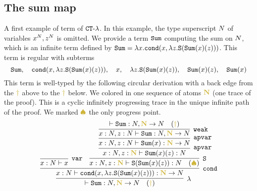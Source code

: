 \documentclass{article}
\begin{document}
\subsection{The sum map}
A first example of term of  ${ {\tt CT} \mbox{-} \lambda}$. 
In this example, the type superscript ${N}$ of variables $x^{N}, z^{N}$ is omitted.
We provide a term ${\tt Sum}$ computing the sum on ${N}$,
which is an infinite term defined by ${\tt Sum} = \lambda x.{\tt cond}(x,\lambda z.{\tt S}({\tt Sum}(x)(z)))$.
This term is regular with subterms 
$$
{\tt Sum}, \  \  \ {\tt cond}(x,\lambda z.{\tt S}({\tt Sum}(x)(z))), 
\  \  \ x, \  \  \ \lambda z.{\tt S}({\tt Sum}(x)(z)),  \  \  \ {\tt Sum}(x)(z), \  \  \ {\tt Sum}(x)
$$
This term is well-typed by the following circular derivation with a back edge from the 
$\bfColor{oldgold}{\dagger}$ above to the $\bfColor{oldgold}{\dagger}$ below.
We colored in  one sequence of atoms $\bfColor{oldgold}{\N}$ 
(one trace of the proof).
This is a cyclic infinitely progressing trace in the unique infinite path of the proof. 
We marked $\bfColor{oldgold}{ \spadesuit}$ the only progress point.
\[
\infer[\lambda]{
  \vdash \Sum:\N, \bfColor{oldgold}{\N} \rightarrow \N 
   \ \ \ (\bfColor{oldgold}{\dagger})
}{
  \infer[\cond]{
    x : \N \vdash 
    \cond(x,\lambda z.\Succ(\Sum(x)(z))): \bfColor{oldgold}{\N} \rightarrow \N
  }{
    \infer[\var]{
      x : \N \vdash x
    }{}
    &
    \infer[\Succ]{
      x:\N, z : \bfColor{oldgold}{\N} 
      \vdash \Succ(\Sum(x)(z)): \N  
        \ \ \ (\bfColor{oldgold}{ \spadesuit})
    }{
      \infer[\apvar]{
       x:\N, z : \bfColor{oldgold}{\N} 
       \vdash \Sum(x)(z): \N
      }{
         \infer[\apvar]{
       x:\N, z : \N
       \vdash \Sum(x): \bfColor{oldgold}{\N} \rightarrow \N
         }{
         \infer[\weak]{
         x:\N, z : \N
         \vdash \Sum: \N, \bfColor{oldgold}{\N} \rightarrow  \N
          }{
         \vdash \Sum: \N, \bfColor{oldgold}{\N} \rightarrow \N 
           \ \ \ (\bfColor{oldgold}{\dagger})
          }
        }
      }
    }
  }
}
\]

%


\end{document}
